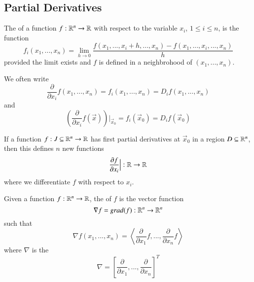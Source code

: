 \documentclass[12pt]{report}
\begin{document}
\begin{appendices}
    \subsection{Partial Derivatives}

    \begin{defn}{}{}
        The  of a function $f:\mathbb R^n\rightarrow \mathbb R$ with respect to the variable $x_i$, $1 \leq i \leq n$, is the function \begin{equation}
            f_i(x_1,...,x_n) = \lim_{h\rightarrow 0}\frac{f(x_1,...,x_i+h,...,x_n) - f(x_1,...,x_i,...,x_n)}{h}
        \end{equation}
        provided the limit exists and $f$ is defined in a neighbrohood of $(x_1,...,x_n)$.
    \end{defn}

    \begin{nota*}{}{}
        We often write \begin{equation}
            \frac{\partial}{\partial x_i}f(x_1,...,x_n) = f_i(x_1,...,x_n) = D_if(x_1,...,x_n)
        \end{equation}
        and \begin{equation}
            \left(\frac{\partial}{\partial x_i}f(\vec{x})\right)\Big\rvert_{\vec{x}_0} = f_i(\vec{x}_0) = D_if(\vec{x}_0)
        \end{equation}
    \end{nota*}
    

    \begin{rmk}{}{}
        If a function $f:J\subseteq \mathbb R^n\rightarrow \mathbb R$ has first partial derivatives at $\vec{x}_0$ in a region $D \subseteq \mathbb R^n$, then this defines $n$ new functions \begin{equation}
            \frac{\partial f}{\partial x_i}\Big\rvert:\mathbb R\rightarrow \mathbb R
        \end{equation}
        where we differentiate $f$ with respect to $x_i$.
    \end{rmk}

    \begin{defn}{}{}
        Given a function $f:\mathbb R^n\rightarrow \mathbb R$, the  of $f$ is the vector function \begin{equation}
            \nabla f = grad(f):\mathbb R^n\rightarrow\mathbb R^n
        \end{equation}
        such that \begin{equation}
            \nabla f(x_1,...,x_n) = \left\langle \frac{\partial}{\partial x_1}f,...,\frac{\partial}{\partial x_n}f\right\rangle
        \end{equation}
        where $\nabla$ is the  \begin{equation}
            \nabla = \left[\frac{\partial}{\partial x_1},...,\frac{\partial}{\partial x_n}\right]^T
        \end{equation}
    \end{defn}



\end{appendices}
\end{document}
